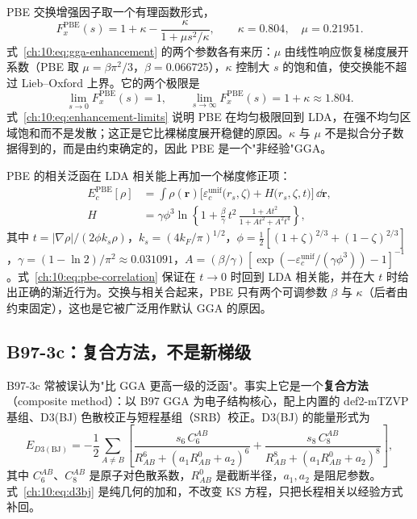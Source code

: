 PBE 交换增强因子取一个有理函数形式，
\begin{equation}
F_x^{\mathrm{PBE}}(s)
= 1+\kappa-\frac{\kappa}{1+\mu s^2/\kappa},
\qquad
\kappa=0.804,\quad \mu=0.21951 .
\label{ch:10:eq:gga-enhancement}
\end{equation}
式~\eqref{ch:10:eq:gga-enhancement} 的两个参数各有来历：$\mu$ 由线性响应恢复梯度展开系数（PBE 取 $\mu=\beta\pi^2/3$，$\beta=0.066725$），$\kappa$ 控制大 $s$ 的饱和值，使交换能不超过 Lieb--Oxford 上界。它的两个极限是
\begin{equation}
\lim_{s\to 0}F_x^{\mathrm{PBE}}(s)=1,
\qquad
\lim_{s\to\infty}F_x^{\mathrm{PBE}}(s)=1+\kappa\approx 1.804 .
\label{ch:10:eq:enhancement-limits}
\end{equation}
式~\eqref{ch:10:eq:enhancement-limits} 说明 PBE 在均匀极限回到 LDA，在强不均匀区域饱和而不是发散；这正是它比裸梯度展开稳健的原因。$\kappa$ 与 $\mu$ 不是拟合分子数据得到的，而是由约束确定的，因此 PBE 是一个"非经验"GGA。

PBE 的相关泛函在 LDA 相关能上再加一个梯度修正项：
\begin{equation}
\begin{aligned}
E_c^{\mathrm{PBE}}[\rho]
&= \int \rho(\mathbf r)\Big[\varepsilon_c^{\mathrm{unif}}\big(r_s,\zeta\big)
+ H\big(r_s,\zeta,t\big)\Big]\,\dd\mathbf r,\\
H&= \gamma\phi^3\ln\!\left\{1+\frac{\beta}{\gamma}\,t^2\,
\frac{1+At^2}{1+At^2+A^2t^4}\right\},
\end{aligned}
\label{ch:10:eq:pbe-correlation}
\end{equation}
其中 $t=\lvert\nabla\rho\rvert/(2\phi k_s\rho)$，$k_s=(4k_F/\pi)^{1/2}$，$\phi=\tfrac12[(1+\zeta)^{2/3}+(1-\zeta)^{2/3}]$，$\gamma=(1-\ln 2)/\pi^2\approx 0.031091$，$A=(\beta/\gamma)[\exp(-\varepsilon_c^{\mathrm{unif}}/(\gamma\phi^3))-1]^{-1}$。式~\eqref{ch:10:eq:pbe-correlation} 保证在 $t\to 0$ 时回到 LDA 相关能，并在大 $t$ 时给出正确的渐近行为。交换与相关合起来，PBE 只有两个可调参数 $\beta$ 与 $\kappa$（后者由约束固定），这也是它被广泛用作默认 GGA 的原因。

\subsection{B97-3c：复合方法，不是新梯级}
\label{ch:10:sec:b973c}

B97-3c 常被误认为"比 GGA 更高一级的泛函"。事实上它是一个\textbf{复合方法}（composite method）：以 B97 GGA 为电子结构核心，配上内置的 def2-mTZVP 基组、D3(BJ) 色散校正与短程基组（SRB）校正。D3(BJ) 的能量形式为
\begin{equation}
E_{D3(\mathrm{BJ})}
= -\frac12\sum_{A\neq B}\left[
\frac{s_6\,C_6^{AB}}{R_{AB}^6+(a_1R_{AB}^0+a_2)^6}
+\frac{s_8\,C_8^{AB}}{R_{AB}^8+(a_1R_{AB}^0+a_2)^8}
\right],
\label{ch:10:eq:d3bj}
\end{equation}
其中 $C_6^{AB}$、$C_8^{AB}$ 是原子对色散系数，$R_{AB}^0$ 是截断半径，$a_1,a_2$ 是阻尼参数\citep{grimme2010d3,grimme2011d3bj}。式~\eqref{ch:10:eq:d3bj} 是纯几何的加和，不改变 KS 方程，只把长程相关以经验方式补回。

